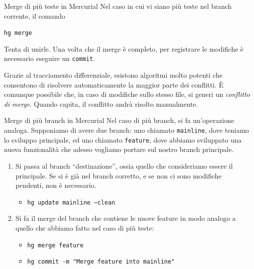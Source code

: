 \documentclass[presentation]{beamer}
\begin{document}
\begin{frame}{Merge di più teste in Mercurial}
	Nel caso in cui vi siano più teste nel branch corrente, il comando
	\begin{center}
		\texttt{hg merge}
	\end{center}
	Tenta di unirle.
	Una volta che il merge è completo, per registrare le modifiche è necessario eseguire un \texttt{commit}.

	Grazie al tracciamento differenziale, esistono algoritmi molto potenti che consentono di risolvere automaticamente la maggior parte dei conflitti. È comunque possibile che, in caso di modifiche sullo stesso file, si generi un \emph{conflitto di merge}. Quando capita, il conflitto andrà risolto manualmente.
\end{frame}

\begin{frame}{Merge di più branch in Mercurial}
	Nel caso di più branch, si fa un'operazione analoga. Supponiamo di avere due branch: uno chiamato \texttt{mainline}, dove teniamo lo sviluppo principale, ed uno chiamato \texttt{feature}, dove abbiamo sviluppato una nuova funzionalità che adesso vogliamo portare sul nostro branch principale.
	\begin{enumerate}
	 \item Si passa al branch ``destinazione'', ossia quello che consideriamo essere il principale. Se si è già nel branch corretto, e se non ci sono modifiche pendenti, non è necessario.
		\begin{itemize}
		 \item \texttt{hg update mainline --clean}
		\end{itemize}
	 \item Si fa il merge del branch che contiene le nuove feature in modo analogo a quello che abbiamo fatto nel caso di più teste:
		\begin{itemize}
		 \item \texttt{hg merge feature}
		 \item \texttt{hg commit -m "Merge feature into mainline"}
		\end{itemize}
	\end{enumerate}
\end{frame}
\end{document}
